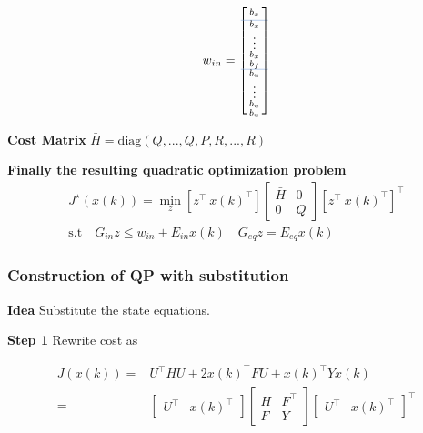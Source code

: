\[	%
	w_{in} =
	\begin{bmatrix}
		\noalign{\arrayrulewidth=0.1mm}\arrayrulecolor{RoyalBlue!50}
		\begin{smallmatrix}
			b_x\\
		\end{smallmatrix}
		\\ \hline
		\begin{smallmatrix}
			b_x\\
			\vdots\\
			b_x\\
			b_f\\
		\end{smallmatrix}
		\\ \hline
		\begin{smallmatrix}
			b_u\\
			\vdots\\
			b_u\\
			b_u\\
		\end{smallmatrix}
	\end{bmatrix}
\]

\textbf{Cost Matrix} $\bar{H} = \mathrm{diag}(Q,..., Q, P, R,..., R)$

\textbf{Finally the resulting quadratic optimization problem}
\[\begin{aligned}
		J^\star(x(k)) = \min_z  \left[ z^\top \ x(k)^\top \right]
		\left[\begin{smallmatrix} \bar{H} & 0 \\ 0 & Q \end{smallmatrix}\right]
		\left[ z^\top \ x(k)^\top \right]^\top \\
		\text{s.t}
		\quad G_{in}z \leq w_{in} + E_{in}x(k)
		\quad	G_{eq}z = E_{eq}x(k)
	\end{aligned}\]

\subsubsection{Construction of QP with substitution}

\textbf{Idea} Substitute the state equations.

\textbf{Step 1} Rewrite cost  as

\[\begin{aligned}
		J(x(k)) = & U^\top HU+2x(k)^\top FU+x(k)^\top Y x(k) \\
		=         & \begin{bmatrix}
			            U^\top & x(k)^\top
		            \end{bmatrix}
		\left[\begin{smallmatrix}
				      H & F^\top \\
				      F & Y
			      \end{smallmatrix}\right]
		\begin{bmatrix}
			U^\top & x(k)^\top
		\end{bmatrix}^\top
	\end{aligned} \]

